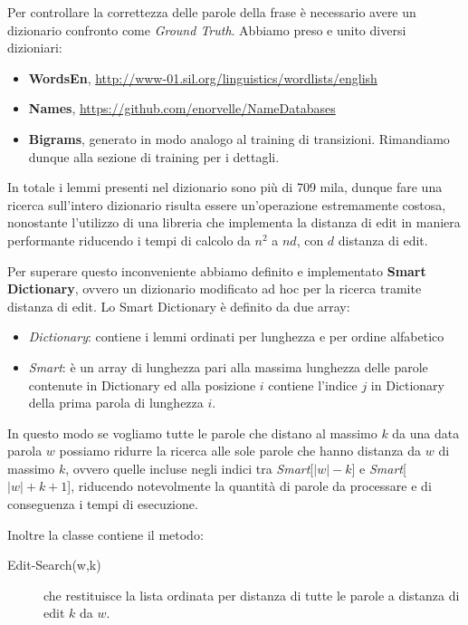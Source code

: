 Per controllare la correttezza delle parole della frase \`e necessario
avere un dizionario confronto come \textit{Ground Truth}. 
Abbiamo preso e unito diversi dizioniari:
\begin{itemize}
  \item \textbf{WordsEn}, \url{http://www-01.sil.org/linguistics/wordlists/english}
  \item \textbf{Names}, \url{https://github.com/enorvelle/NameDatabases}
  \item \textbf{Bigrams}, generato in modo analogo al training di transizioni. Rimandiamo dunque alla sezione di training per i 
      dettagli.
\end{itemize}

In totale i lemmi presenti nel dizionario sono pi\`u di 709 mila,
dunque fare una ricerca sull'intero dizionario risulta essere 
un'operazione estremamente costosa, nonostante l'utilizzo di una
libreria che implementa la distanza di edit in maniera performante
riducendo i tempi di calcolo da $n^2$ a $nd$, con $d$ distanza di 
edit.

Per superare questo inconveniente abbiamo definito e implementato 
\textbf{Smart Dictionary}, ovvero un dizionario modificato ad hoc per
la ricerca tramite distanza di edit. Lo Smart Dictionary \`e definito 
da due array:
\begin{itemize}
  \item \textit{Dictionary}: contiene i lemmi ordinati per lunghezza e per 
  ordine alfabetico
  \item \textit{Smart}: \`e un array di lunghezza pari alla massima 
  lunghezza delle parole contenute in Dictionary ed alla posizione $i$
  contiene l'indice $j$ in Dictionary della prima parola di lunghezza $i$. 
\end{itemize}

In questo modo se vogliamo tutte le parole che distano al massimo $k$ 
da una data parola $w$ possiamo ridurre la ricerca alle sole
parole che hanno distanza da $w$ di massimo $k$, ovvero quelle 
incluse negli indici tra \textit{Smart}[$|w| -k$] e 
\textit{Smart}[$|w| +k +1$], riducendo notevolmente la quantit\`a di 
parole da processare e di conseguenza i tempi di esecuzione.

Inoltre la classe contiene il metodo:
\begin{description}
  \item[Edit-Search(w,k)] che restituisce la lista ordinata per 
  distanza di tutte le parole a distanza di edit $k$ da $w$. 
\end{description}

